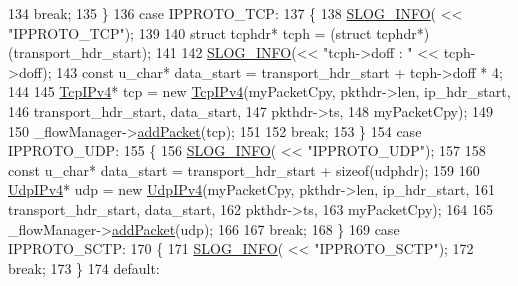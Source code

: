 \begin{DoxyCode}
{{134                 \textcolor{keywordflow}{break};
135             \}
136             \textcolor{keywordflow}{case} IPPROTO\_TCP:
137             \{
138                 \hyperlink{_logger_8h_a119c1c29ba35a8db38e2358e41167282}{SLOG\_INFO}( << \textcolor{stringliteral}{"IPPROTO\_TCP"});
139 
140                 \textcolor{keyword}{struct }tcphdr* tcph = (\textcolor{keyword}{struct }tcphdr*)(transport\_hdr\_start);
141 
142                 \hyperlink{_logger_8h_a119c1c29ba35a8db38e2358e41167282}{SLOG\_INFO}(<< \textcolor{stringliteral}{"tcph->doff : "} << tcph->doff);
143                 \textcolor{keyword}{const} u\_char* data\_start = transport\_hdr\_start  + tcph->doff * 4;
144                 
145                 \hyperlink{class_vsid_common_1_1_tcp_i_pv4}{TcpIPv4}* tcp = \textcolor{keyword}{new} \hyperlink{class_vsid_common_1_1_tcp_i_pv4}{TcpIPv4}(myPacketCpy, pkthdr->len, ip\_hdr\_start, 
146                                             transport\_hdr\_start, data\_start, 
147                                             pkthdr->ts,
148                                             myPacketCpy);
149 
150                 \_flowManager->\hyperlink{class_vsid_common_1_1_flow_manager_a9c840fe2a6650079a3b90ba2d65f1e7e}{addPacket}(tcp);
151 
152                 \textcolor{keywordflow}{break};
153             \}
154             \textcolor{keywordflow}{case} IPPROTO\_UDP:
155             \{
156                 \hyperlink{_logger_8h_a119c1c29ba35a8db38e2358e41167282}{SLOG\_INFO}( << \textcolor{stringliteral}{"IPPROTO\_UDP"});
157 
158                 \textcolor{keyword}{const} u\_char* data\_start = transport\_hdr\_start + \textcolor{keyword}{sizeof}(udphdr);
159 
160                 \hyperlink{class_vsid_common_1_1_udp_i_pv4}{UdpIPv4}* udp = \textcolor{keyword}{new} \hyperlink{class_vsid_common_1_1_udp_i_pv4}{UdpIPv4}(myPacketCpy, pkthdr->len, ip\_hdr\_start, 
161                                         transport\_hdr\_start, data\_start, 
162                                         pkthdr->ts,
163                                         myPacketCpy);
164 
165                 \_flowManager->\hyperlink{class_vsid_common_1_1_flow_manager_a9c840fe2a6650079a3b90ba2d65f1e7e}{addPacket}(udp);
166 
167                 \textcolor{keywordflow}{break};
168             \}
169             \textcolor{keywordflow}{case} IPPROTO\_SCTP:
170             \{
171                 \hyperlink{_logger_8h_a119c1c29ba35a8db38e2358e41167282}{SLOG\_INFO}( << \textcolor{stringliteral}{"IPPROTO\_SCTP"});
172                 \textcolor{keywordflow}{break};
173             \}
174             \textcolor{keywordflow}{default}:
}}
\end{DoxyCode}
